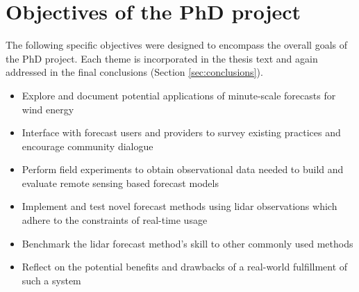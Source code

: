 \chapter{Objectives of the PhD project}
\label{sec:objectives}

The following specific objectives were designed to encompass the overall goals of the PhD project. Each theme is incorporated in the thesis text and again addressed in the final conclusions (Section \ref{sec:conclusions}).

\vspace{0.5cm}

\begin{itemize}
    \item Explore and document potential applications of minute-scale forecasts for wind energy
    \item Interface with forecast users and providers to survey existing practices and encourage community dialogue
    \item Perform field experiments to obtain observational data needed to build and evaluate remote sensing based forecast models
    \item Implement and test novel forecast methods using lidar observations which adhere to the constraints of real-time usage
    \item Benchmark the lidar forecast method's skill to other commonly used methods
    \item Reflect on the potential benefits and drawbacks of a real-world fulfillment of such a system
\end{itemize}